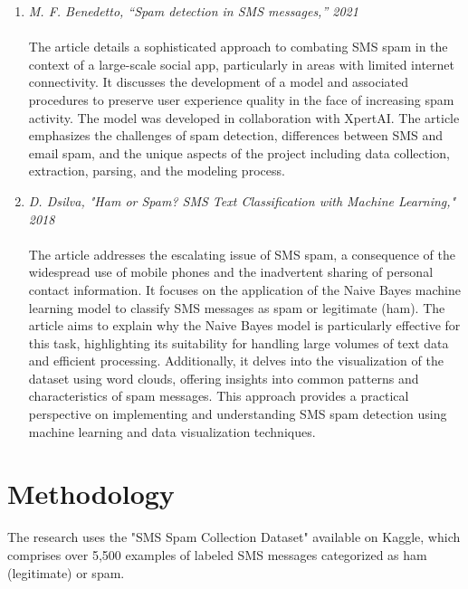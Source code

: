 \documentclass[12pt]{article}
\begin{document}
\begin{enumerate}
  \setlength\itemsep{1em}
  \item \textit{M. F. Benedetto, “Spam detection in SMS messages,” 2021}\cite{Benedetto_2021} \\\\
      The article details a sophisticated approach to combating SMS spam in the context of a large-scale social app, particularly in areas with limited internet connectivity. It discusses the development of a model and associated procedures to preserve user experience quality in the face of increasing spam activity. The model was developed in collaboration with XpertAI\cite{XpertAI_2021}. The article emphasizes the challenges of spam detection, differences between SMS and email spam, and the unique aspects of the project including data collection, extraction, parsing, and the modeling process.
      
    \pagebreak
    
  \item \textit{D. Dsilva, "Ham or Spam? SMS Text Classification with Machine Learning," 2018}\cite{Dsilva_2018} \\\\
    The article addresses the escalating issue of SMS spam, a consequence of the widespread use of mobile phones and the inadvertent sharing of personal contact information. It focuses on the application of the Naive Bayes machine learning model to classify SMS messages as spam or legitimate (ham). The article aims to explain why the Naive Bayes model is particularly effective for this task, highlighting its suitability for handling large volumes of text data and efficient processing. Additionally, it delves into the visualization of the dataset using word clouds, offering insights into common patterns and characteristics of spam messages. This approach provides a practical perspective on implementing and understanding SMS spam detection using machine learning and data visualization techniques.
\end{enumerate}


\section{Methodology}
The research uses the "SMS Spam Collection Dataset" available on Kaggle\cite{dataset_2016}, which comprises over 5,500 examples of labeled SMS messages categorized as ham (legitimate) or spam.\\
\end{document}
